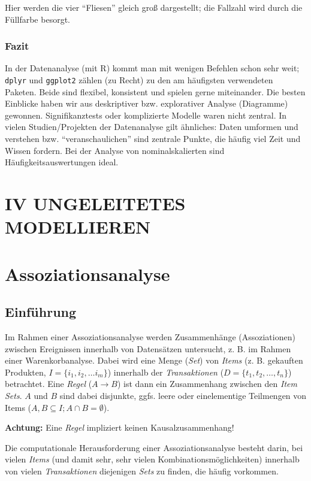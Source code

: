 \documentclass[12pt,]{book}
\begin{document}
Hier werden die vier ``Fliesen'' gleich groß dargestellt; die Fallzahl
wird durch die Füllfarbe besorgt.

\subsection{Fazit}\label{fazit}

In der Datenanalyse (mit R) kommt man mit wenigen Befehlen schon sehr
weit; \texttt{dplyr} und \texttt{ggplot2} zählen (zu Recht) zu den am
häufigsten verwendeten Paketen. Beide sind flexibel, konsistent und
spielen gerne miteinander. Die besten Einblicke haben wir aus
deskriptiver bzw. explorativer Analyse (Diagramme) gewonnen.
Signifikanztests oder komplizierte Modelle waren nicht zentral. In
vielen Studien/Projekten der Datenanalyse gilt ähnliches: Daten umformen
und verstehen bzw. ``veranschaulichen'' sind zentrale Punkte, die häufig
viel Zeit und Wissen fordern. Bei der Analyse von nominalskalierten sind
Häufigkeitsauswertungen ideal.

\chapter*{IV UNGELEITETES
MODELLIEREN}\label{iv-ungeleitetes-modellieren}


\chapter{Assoziationsanalyse}\label{assoziationsanalyse}

\section{Einführung}\label{einfuhrung}

Im Rahmen einer Assoziationsanalyse werden Zusammenhänge (Assoziationen)
zwischen Ereignissen innerhalb von Datensätzen untersucht, z. B. im
Rahmen einer Warenkorbanalyse. Dabei wird eine Menge (\emph{Set}) von
\emph{Items} (z. B. gekauften Produkten,
\(I=\{i_1, i_2, \ldots i_m \}\)) innerhalb der \emph{Transaktionen}
(\(D=\{t_1, t_2 ,\ldots ,t_n\}\)) betrachtet. Eine \emph{Regel}
(\(A \rightarrow B\)) ist dann ein Zusammenhang zwischen den \emph{Item
Sets}. \(A\) und \(B\) sind dabei disjunkte, ggfs. leere oder
einelementige Teilmengen von Items
(\(A, B \subseteq I; A\cap B=\emptyset\)).

\textbf{Achtung:} Eine \emph{Regel} impliziert keinen
Kausalzusammenhang!

Die computationale Herausforderung einer Assoziationsanalyse besteht
darin, bei vielen \emph{Items} (und damit sehr, sehr vielen
Kombinationsmöglichkeiten) innerhalb von vielen \emph{Transaktionen}
diejenigen \emph{Sets} zu finden, die häufig vorkommen.
\end{document}
